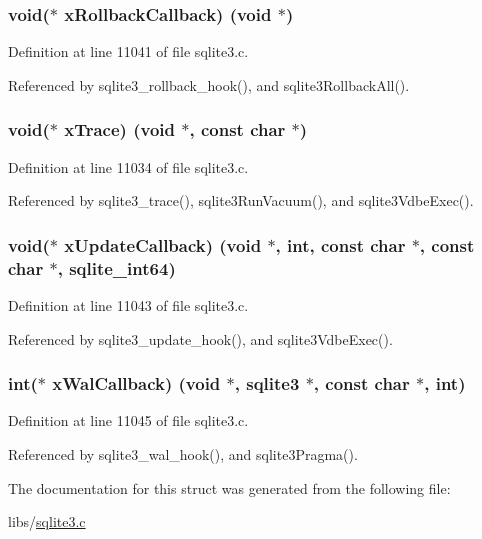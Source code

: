 \subsubsection[{x\+Rollback\+Callback}]{\setlength{\rightskip}{0pt plus 5cm}void($\ast$ x\+Rollback\+Callback) (void $\ast$)}\label{structsqlite3_aa214b2f14d2b0d62e8eca478cc693272}


Definition at line 11041 of file sqlite3.\+c.



Referenced by sqlite3\+\_\+rollback\+\_\+hook(), and sqlite3\+Rollback\+All().

\hypertarget{structsqlite3_a24970a9fc34aaff93a2a313fcbafafe6}{}
\subsubsection[{x\+Trace}]{\setlength{\rightskip}{0pt plus 5cm}void($\ast$ x\+Trace) (void $\ast$, const char $\ast$)}\label{structsqlite3_a24970a9fc34aaff93a2a313fcbafafe6}


Definition at line 11034 of file sqlite3.\+c.



Referenced by sqlite3\+\_\+trace(), sqlite3\+Run\+Vacuum(), and sqlite3\+Vdbe\+Exec().

\hypertarget{structsqlite3_adcf4b0946f328cb0c624619d03686c5b}{}
\subsubsection[{x\+Update\+Callback}]{\setlength{\rightskip}{0pt plus 5cm}void($\ast$ x\+Update\+Callback) (void $\ast$, int, const char $\ast$, const char $\ast$, {\bf sqlite\+\_\+int64})}\label{structsqlite3_adcf4b0946f328cb0c624619d03686c5b}


Definition at line 11043 of file sqlite3.\+c.



Referenced by sqlite3\+\_\+update\+\_\+hook(), and sqlite3\+Vdbe\+Exec().

\hypertarget{structsqlite3_acb709ae5873ab3a583631314ab73c5b4}{}
\subsubsection[{x\+Wal\+Callback}]{\setlength{\rightskip}{0pt plus 5cm}int($\ast$ x\+Wal\+Callback) (void $\ast$, {\bf sqlite3} $\ast$, const char $\ast$, int)}\label{structsqlite3_acb709ae5873ab3a583631314ab73c5b4}


Definition at line 11045 of file sqlite3.\+c.



Referenced by sqlite3\+\_\+wal\+\_\+hook(), and sqlite3\+Pragma().



The documentation for this struct was generated from the following file\+:\begin{DoxyCompactItemize}
\item 
libs/\hyperlink{sqlite3_8c}{sqlite3.\+c}\end{DoxyCompactItemize}
